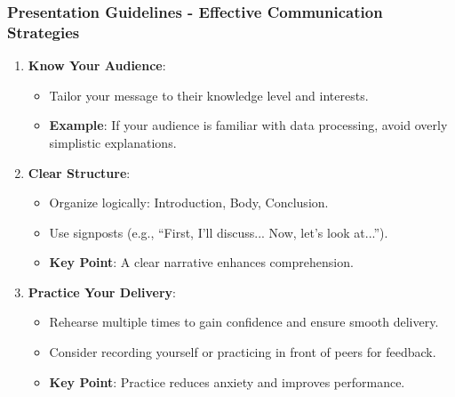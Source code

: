 \documentclass[aspectratio=169]{beamer}
\begin{document}
\begin{frame}[fragile]
    \frametitle{Presentation Guidelines - Effective Communication Strategies}
    \begin{enumerate}
        \item \textbf{Know Your Audience}:
            \begin{itemize}
                \item Tailor your message to their knowledge level and interests. 
                \item \textbf{Example}: If your audience is familiar with data processing, avoid overly simplistic explanations.
            \end{itemize}
        
        \item \textbf{Clear Structure}:
            \begin{itemize}
                \item Organize logically: Introduction, Body, Conclusion.
                \item Use signposts (e.g., “First, I’ll discuss... Now, let’s look at...”).
                \item \textbf{Key Point}: A clear narrative enhances comprehension.
            \end{itemize}
        
        \item \textbf{Practice Your Delivery}:
            \begin{itemize}
                \item Rehearse multiple times to gain confidence and ensure smooth delivery.
                \item Consider recording yourself or practicing in front of peers for feedback.
                \item \textbf{Key Point}: Practice reduces anxiety and improves performance.
            \end{itemize}
    \end{enumerate}
\end{frame}
\end{document}
